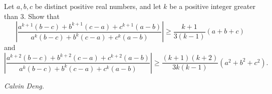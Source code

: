 Let $a,b,c$ be distinct positive real numbers, and let $k$ be a positive integer greater than $3$. Show that
\[\left\lvert\frac{a^{k+1}(b-c)+b^{k+1}(c-a)+c^{k+1}(a-b)}{a^k(b-c)+b^k(c-a)+c^k(a-b)}\right\rvert\ge \frac{k+1}{3(k-1)}(a+b+c)\]
and
\[\left\lvert\frac{a^{k+2}(b-c)+b^{k+2}(c-a)+c^{k+2}(a-b)}{a^k(b-c)+b^k(c-a)+c^k(a-b)}\right\rvert\ge \frac{(k+1)(k+2)}{3k(k-1)}(a^2+b^2+c^2).\]

\textit{Calvin Deng.}